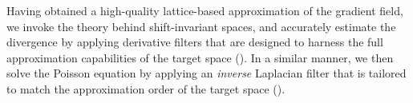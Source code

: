 Having obtained a high-quality lattice-based approximation of the
gradient field, we invoke the theory behind shift-invariant spaces,
and accurately estimate the divergence by applying derivative filters
that are designed to harness the full approximation capabilities of
the target space (). In a similar manner, we then
solve the Poisson equation by applying an \emph{inverse} Laplacian
filter that is tailored to match the approximation order of the target
space ().
